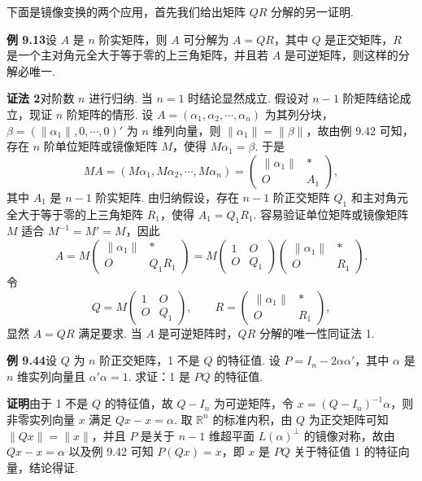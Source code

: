 \documentclass[UTF8, 12pt, fontset=fandol, oneside]{ctexart}
\begin{document}
下面是镜像变换的两个应用，首先我们给出矩阵 $QR$ 分解的另一证明.

\noindent\textbf{例 9.13}\quad 设 $A$ 是 $n$ 阶实矩阵，则 $A$ 可分解为 $A=QR$，其中 $Q$ 是正交矩阵，$R$ 是一个主对角元全大于等于零的上三角矩阵，并且若 $A$ 是可逆矩阵，则这样的分解必唯一.

\noindent\textbf{证法 2}\quad 对阶数 $n$ 进行归纳. 当 $n=1$ 时结论显然成立. 假设对 $n-1$ 阶矩阵结论成立，现证 $n$ 阶矩阵的情形. 设 $A=(\alpha_1,\alpha_2,\cdots,\alpha_n)$ 为其列分块，$\beta=(\|\alpha_1\|,0,\cdots,0)'$ 为 $n$ 维列向量，则 $\|\alpha_1\|=\|\beta\|$，故由例 9.42 可知，存在 $n$ 阶单位矩阵或镜像矩阵 $M$，使得 $M\alpha_1=\beta$. 于是
\[
MA=(M\alpha_1,M\alpha_2,\cdots,M\alpha_n)=
\begin{pmatrix}
\|\alpha_1\|&*\\
O&A_1
\end{pmatrix},
\]
其中 $A_1$ 是 $n-1$ 阶实矩阵. 由归纳假设，存在 $n-1$ 阶正交矩阵 $Q_1$ 和主对角元全大于等于零的上三角矩阵 $R_1$，使得 $A_1=Q_1R_1$. 容易验证单位矩阵或镜像矩阵 $M$ 适合 $M^{-1}=M'=M$，因此
\[
A=M\begin{pmatrix}
\|\alpha_1\|&*\\
O&Q_1R_1
\end{pmatrix}
=M\begin{pmatrix}
1&O\\
O&Q_1
\end{pmatrix}
\begin{pmatrix}
\|\alpha_1\|&*\\
O&R_1
\end{pmatrix}.
\]
令
\[
Q=M\begin{pmatrix}
1&O\\
O&Q_1
\end{pmatrix},\qquad
R=\begin{pmatrix}
\|\alpha_1\|&*\\
O&R_1
\end{pmatrix},
\]
显然 $A=QR$ 满足要求. 当 $A$ 是可逆矩阵时，$QR$ 分解的唯一性同证法 1.

\noindent\textbf{例 9.44}\quad 设 $Q$ 为 $n$ 阶正交矩阵，1 不是 $Q$ 的特征值. 设 $P=I_n-2\alpha\alpha'$，其中 $\alpha$ 是 $n$ 维实列向量且 $\alpha'\alpha=1$. 求证：1 是 $PQ$ 的特征值.

\noindent\textbf{证明}\quad 由于 1 不是 $Q$ 的特征值，故 $Q-I_n$ 为可逆矩阵，令 $x=(Q-I_n)^{-1}\alpha$，则非零实列向量 $x$ 满足 $Qx-x=\alpha$. 取 $\mathbb{R}^n$ 的标准内积，由 $Q$ 为正交矩阵可知 $\|Qx\|=\|x\|$，并且 $P$ 是关于 $n-1$ 维超平面 $L(\alpha)^\perp$ 的镜像对称，故由 $Qx-x=\alpha$ 以及例 9.42 可知 $P(Qx)=x$，即 $x$ 是 $PQ$ 关于特征值 1 的特征向量，结论得证.
\end{document}
